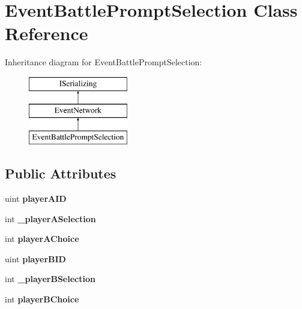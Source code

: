 \hypertarget{class_event_battle_prompt_selection}{\section{Event\-Battle\-Prompt\-Selection Class Reference}
\label{class_event_battle_prompt_selection}
}
Inheritance diagram for Event\-Battle\-Prompt\-Selection\-:\begin{figure}[H]
\begin{center}
\leavevmode
\includegraphics[height=3.000000cm]{class_event_battle_prompt_selection}
\end{center}
\end{figure}
\subsection*{Public Attributes}
\begin{DoxyCompactItemize}
\item 
\hypertarget{class_event_battle_prompt_selection_a3a3a30b00d2cbb9e1fd3658667b5f0bf}{uint {\bfseries player\-A\-I\-D}}\label{class_event_battle_prompt_selection_a3a3a30b00d2cbb9e1fd3658667b5f0bf}

\item 
\hypertarget{class_event_battle_prompt_selection_adb27194b379be6543169a2a56e47eabb}{int {\bfseries \-\_\-player\-A\-Selection}}\label{class_event_battle_prompt_selection_adb27194b379be6543169a2a56e47eabb}

\item 
\hypertarget{class_event_battle_prompt_selection_a2a6c2af764a1838c48c1ecafdfc0a0f0}{int {\bfseries player\-A\-Choice}}\label{class_event_battle_prompt_selection_a2a6c2af764a1838c48c1ecafdfc0a0f0}

\item 
\hypertarget{class_event_battle_prompt_selection_ab50685401b7d5cc0491616b1515a66cb}{uint {\bfseries player\-B\-I\-D}}\label{class_event_battle_prompt_selection_ab50685401b7d5cc0491616b1515a66cb}

\item 
\hypertarget{class_event_battle_prompt_selection_acd387c1dfc6906e2c69bc9cc7e6febf6}{int {\bfseries \-\_\-player\-B\-Selection}}\label{class_event_battle_prompt_selection_acd387c1dfc6906e2c69bc9cc7e6febf6}

\item 
\hypertarget{class_event_battle_prompt_selection_a7792914c7817740ed88e6d6f5f2a5356}{int {\bfseries player\-B\-Choice}}\label{class_event_battle_prompt_selection_a7792914c7817740ed88e6d6f5f2a5356}

\end{DoxyCompactItemize}
